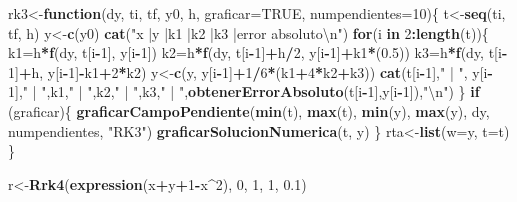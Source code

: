 \documentclass[]{article}
\newenvironment{Shaded}{\begin{snugshade}}{\end{snugshade}}
\newcommand{\KeywordTok}[1]{\textcolor[rgb]{0.13,0.29,0.53}{\textbf{#1}}}
\newcommand{\DataTypeTok}[1]{\textcolor[rgb]{0.13,0.29,0.53}{#1}}
\newcommand{\DecValTok}[1]{\textcolor[rgb]{0.00,0.00,0.81}{#1}}
\newcommand{\FloatTok}[1]{\textcolor[rgb]{0.00,0.00,0.81}{#1}}
\newcommand{\CharTok}[1]{\textcolor[rgb]{0.31,0.60,0.02}{#1}}
\newcommand{\StringTok}[1]{\textcolor[rgb]{0.31,0.60,0.02}{#1}}
\newcommand{\OtherTok}[1]{\textcolor[rgb]{0.56,0.35,0.01}{#1}}
\newcommand{\ControlFlowTok}[1]{\textcolor[rgb]{0.13,0.29,0.53}{\textbf{#1}}}
\newcommand{\OperatorTok}[1]{\textcolor[rgb]{0.81,0.36,0.00}{\textbf{#1}}}
\newcommand{\NormalTok}[1]{#1}
\begin{document}
\begin{Shaded}
\begin{Highlighting}[]
\NormalTok{rk3<-}\ControlFlowTok{function}\NormalTok{(dy, ti, tf, y0, h, }\DataTypeTok{graficar=}\OtherTok{TRUE}\NormalTok{, }\DataTypeTok{numpendientes=}\DecValTok{10}\NormalTok{)\{}
\NormalTok{  t<-}\KeywordTok{seq}\NormalTok{(ti, tf, h)}
\NormalTok{  y<-}\KeywordTok{c}\NormalTok{(y0)}
  \KeywordTok{cat}\NormalTok{(}\StringTok{"x    |y         |k1         |k2        |k3       |error absoluto}\CharTok{\textbackslash{}n}\StringTok{"}\NormalTok{)}
  \ControlFlowTok{for}\NormalTok{(i }\ControlFlowTok{in} \DecValTok{2}\OperatorTok{:}\KeywordTok{length}\NormalTok{(t))\{}
\NormalTok{    k1=h}\OperatorTok{*}\KeywordTok{f}\NormalTok{(dy, t[i}\OperatorTok{-}\DecValTok{1}\NormalTok{], y[i}\OperatorTok{-}\DecValTok{1}\NormalTok{])}
\NormalTok{    k2=h}\OperatorTok{*}\KeywordTok{f}\NormalTok{(dy, t[i}\OperatorTok{-}\DecValTok{1}\NormalTok{]}\OperatorTok{+}\NormalTok{h}\OperatorTok{/}\DecValTok{2}\NormalTok{, y[i}\OperatorTok{-}\DecValTok{1}\NormalTok{]}\OperatorTok{+}\NormalTok{k1}\OperatorTok{*}\NormalTok{(}\FloatTok{0.5}\NormalTok{))}
\NormalTok{    k3=h}\OperatorTok{*}\KeywordTok{f}\NormalTok{(dy, t[i}\OperatorTok{-}\DecValTok{1}\NormalTok{]}\OperatorTok{+}\NormalTok{h, y[i}\OperatorTok{-}\DecValTok{1}\NormalTok{]}\OperatorTok{-}\NormalTok{k1}\OperatorTok{+}\DecValTok{2}\OperatorTok{*}\NormalTok{k2)}
\NormalTok{    y<-}\KeywordTok{c}\NormalTok{(y, y[i}\OperatorTok{-}\DecValTok{1}\NormalTok{]}\OperatorTok{+}\DecValTok{1}\OperatorTok{/}\DecValTok{6}\OperatorTok{*}\NormalTok{(k1}\OperatorTok{+}\DecValTok{4}\OperatorTok{*}\NormalTok{k2}\OperatorTok{+}\NormalTok{k3))}
    \KeywordTok{cat}\NormalTok{(t[i}\OperatorTok{-}\DecValTok{1}\NormalTok{],}\StringTok{" | "}\NormalTok{, y[i}\OperatorTok{-}\DecValTok{1}\NormalTok{],}\StringTok{" | "}\NormalTok{,k1,}\StringTok{" | "}\NormalTok{,k2,}\StringTok{" | "}\NormalTok{,k3,}\StringTok{" | "}\NormalTok{,}\KeywordTok{obtenerErrorAbsoluto}\NormalTok{(t[i}\OperatorTok{-}\DecValTok{1}\NormalTok{],y[i}\OperatorTok{-}\DecValTok{1}\NormalTok{]),}\StringTok{"}\CharTok{\textbackslash{}n}\StringTok{"}\NormalTok{)}
\NormalTok{  \}}
  \ControlFlowTok{if}\NormalTok{ (graficar)\{}
    \KeywordTok{graficarCampoPendiente}\NormalTok{(}\KeywordTok{min}\NormalTok{(t), }\KeywordTok{max}\NormalTok{(t), }\KeywordTok{min}\NormalTok{(y), }\KeywordTok{max}\NormalTok{(y), dy, numpendientes, }\StringTok{"RK3"}\NormalTok{)}
    \KeywordTok{graficarSolucionNumerica}\NormalTok{(t, y)}
\NormalTok{  \}}
\NormalTok{  rta<-}\KeywordTok{list}\NormalTok{(}\DataTypeTok{w=}\NormalTok{y, }\DataTypeTok{t=}\NormalTok{t)}
\NormalTok{\}}

\NormalTok{r<-}\KeywordTok{Rrk4}\NormalTok{(}\KeywordTok{expression}\NormalTok{(x}\OperatorTok{+}\NormalTok{y}\OperatorTok{+}\DecValTok{1}\OperatorTok{-}\NormalTok{x}\OperatorTok{^}\DecValTok{2}\NormalTok{), }\DecValTok{0}\NormalTok{, }\DecValTok{1}\NormalTok{, }\DecValTok{1}\NormalTok{, }\FloatTok{0.1}\NormalTok{)}
\end{Highlighting}
\end{Shaded}
\end{document}
